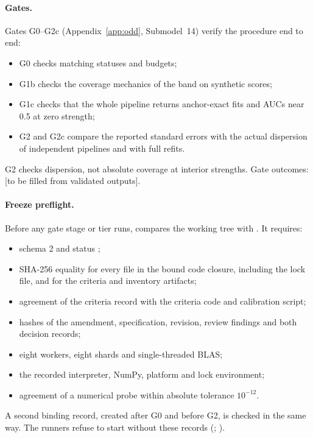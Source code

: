 \paragraph{Gates.}
Gates G0--G2c (Appendix~\ref{app:odd}, Submodel~14) verify the procedure end to end:
\begin{itemize}
\item G0 checks matching statuses and budgets;
\item G1b checks the coverage mechanics of the band on synthetic scores;
\item G1c checks that the whole pipeline returns anchor-exact fits and AUCs near 0.5 at zero strength;
\item G2 and G2c compare the reported standard errors with the actual dispersion of independent pipelines and with full refits.
\end{itemize}
G2 checks dispersion, not absolute coverage at interior strengths. Gate outcomes: [to be filled from validated outputs].

\paragraph{Freeze preflight.}
Before any gate stage or tier runs,  compares the working tree with . It requires:
\begin{itemize}
\item schema 2 and status ;
\item SHA-256 equality for every file in the bound code closure, including the lock file, and for the criteria and inventory artifacts;
\item agreement of the criteria record with the criteria code and calibration script;
\item hashes of the amendment, specification, revision, review findings and both decision records;
\item eight workers, eight shards and single-threaded BLAS;
\item the recorded interpreter, NumPy, platform and lock environment;
\item agreement of a numerical probe within absolute tolerance $10^{-12}$.
\end{itemize}
A second binding record, created after G0 and before G2, is checked in the same way. The runners refuse to start without these records (; ).

